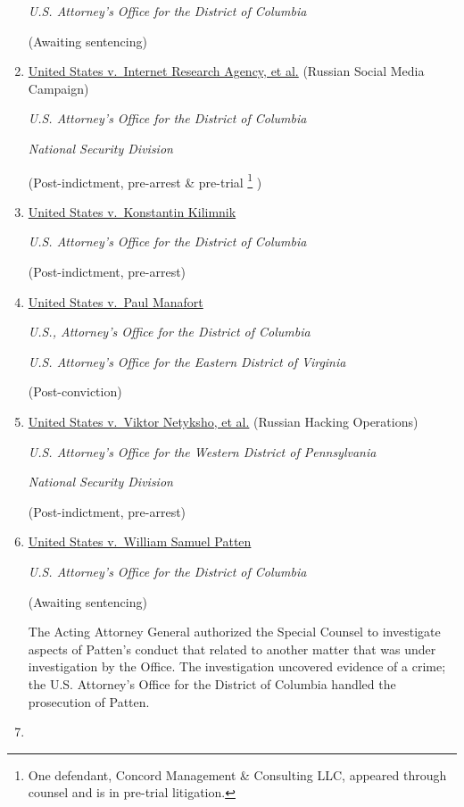 \begin{enumerate}[1.]
\textit{U.S. Attorney's Office for the District of Columbia}

(Awaiting sentencing)

    \item \underline{United States v.\ Internet Research Agency, et al.} (Russian Social Media Campaign)

\textit{U.S. Attorney's Office for the District of Columbia}

\textit{National Security Division}

(Post-indictment, pre-arrest \& pre-trial%
\footnote{One defendant, Concord Management \& Consulting LLC, appeared through counsel and is in pre-trial litigation.}
)

    \item \underline{United States v.\ Konstantin Kilimnik}

\textit{U.S. Attorney's Office for the District of Columbia}

(Post-indictment, pre-arrest)

    \item \underline{United States v.\ Paul Manafort}

\textit{U.S., Attorney's Office for the District of Columbia}

\textit{U.S. Attorney's Office for the Eastern District of Virginia}

(Post-conviction)

    \item \underline{United States v.\ Viktor Netyksho, et al.} (Russian Hacking Operations)

\textit{U.S. Attorney's Office for the Western District of Pennsylvania}

\textit{National Security Division}

(Post-indictment, pre-arrest)

    \item \underline{United States v.\ William Samuel Patten}

\textit{U.S. Attorney's Office for the District of Columbia}

(Awaiting sentencing)

The Acting Attorney General authorized the Special Counsel to investigate aspects of Patten's conduct that related to another matter that was under investigation by the Office.
The investigation uncovered evidence of a crime; the U.S. Attorney's Office for the District of Columbia handled the prosecution of Patten.

    \item \underline{}


\end{enumerate}
